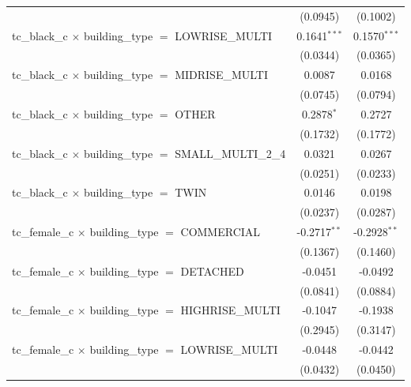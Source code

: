 \begin{tabular}{lcc}
                                                                       & (0.0945)       & (0.1002)\\   
   tc\_black\_c $\times$ building\_type $=$ LOWRISE\_MULTI             & 0.1641$^{***}$ & 0.1570$^{***}$\\   
                                                                       & (0.0344)       & (0.0365)\\   
   tc\_black\_c $\times$ building\_type $=$ MIDRISE\_MULTI             & 0.0087         & 0.0168\\   
                                                                       & (0.0745)       & (0.0794)\\   
   tc\_black\_c $\times$ building\_type $=$ OTHER                      & 0.2878$^{*}$   & 0.2727\\   
                                                                       & (0.1732)       & (0.1772)\\   
   tc\_black\_c $\times$ building\_type $=$ SMALL\_MULTI\_2\_4         & 0.0321         & 0.0267\\   
                                                                       & (0.0251)       & (0.0233)\\   
   tc\_black\_c $\times$ building\_type $=$ TWIN                       & 0.0146         & 0.0198\\   
                                                                       & (0.0237)       & (0.0287)\\   
   tc\_female\_c $\times$ building\_type $=$ COMMERCIAL                & -0.2717$^{**}$ & -0.2928$^{**}$\\   
                                                                       & (0.1367)       & (0.1460)\\   
   tc\_female\_c $\times$ building\_type $=$ DETACHED                  & -0.0451        & -0.0492\\   
                                                                       & (0.0841)       & (0.0884)\\   
   tc\_female\_c $\times$ building\_type $=$ HIGHRISE\_MULTI           & -0.1047        & -0.1938\\   
                                                                       & (0.2945)       & (0.3147)\\   
   tc\_female\_c $\times$ building\_type $=$ LOWRISE\_MULTI            & -0.0448        & -0.0442\\   
                                                                       & (0.0432)       & (0.0450)\\   

\end{tabular}
